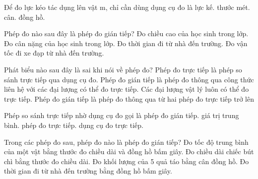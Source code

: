 \begin{ex}
Để đo lực kéo tác dụng lên vật m, chỉ cần dùng dụng cụ đo là
\choice
{\True lực kế.}
{thước mét.}
{cân.}
{đồng hồ.}
\end{ex}

\begin{ex}
Phép đo nào sau đây là phép đo gián tiếp?
\choice
{Đo chiều cao của học sinh trong lớp.}
{Đo cân nặng của học sinh trong lớp.}
{Đo thời gian đi từ nhà đến trường.}
{\True Đo vận tốc đi xe đạp từ nhà đến trường.}
\end{ex}

\begin{ex}
Phát biểu nào sau đây là sai khi nói về phép đo?
\choice
{Phép đo trực tiếp là phép so sánh trực tiếp qua dụng cụ đo.}
{Phép đo gián tiếp là phép đo thông qua công thức liên hệ với các đại lượng có thể đo trực tiếp.}
{\True Các đại lượng vật lý luôn có thể đo trực tiếp.}
{Phép đo gián tiếp là phép đo thông qua từ hai phép đo trực tiếp trở lên}
\end{ex}

\begin{ex}
Phép so sánh trực tiếp nhờ dụng cụ đo gọi là
\choice
{phép đo gián tiếp.}
{giá trị trung bình.}
{\True phép đo trực tiếp.}
{dụng cụ đo trực tiếp.}
\end{ex}

\begin{ex}
Trong các phép đo sau, phép đo nào là phép đo gián tiếp?
\choice
{\True Đo tốc độ trung bình của một vật bằng thước đo chiều dài và đồng hồ bấm giây.}
{Đo chiều dài chiếc bút chì bằng thước đo chiều dài.}
{Đo khối lượng của 5 quả táo bằng cân đồng hồ.}
{Đo thời gian đi từ nhà đến trường bằng đồng hồ bấm giây.}
\end{ex}

